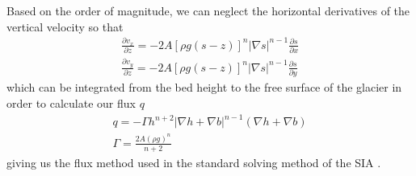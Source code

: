 \documentclass{article}
\begin{document}
Based on the order of magnitude, we can neglect the horizontal derivatives of the vertical velocity so that
\begin{subequations}
\begin{gather}
    \frac{\partial v_x}{\partial z} = -2A[\rho g (s-z)]^n|\nabla s |^{n-1}\frac{\partial s}{\partial x} \\
    \frac{\partial v_y}{\partial z} = -2A[\rho g (s-z)]^n|\nabla s |^{n-1}\frac{\partial s}{\partial y} 
\end{gather}
\end{subequations}
which can be integrated from the bed height to the free surface of the glacier in order to calculate our flux $q$
\begin{subequations}
\begin{gather}\label{q}
    q = -\Gamma  h^{n+2} |\nabla h+\nabla b|^{n-1} (\nabla h + \nabla b)  \\
    \Gamma = \frac{2A (\rho g)^n}{n+2} 
\end{gather}
\end{subequations}
giving us the flux method used in the standard solving method of the SIA \citep{Jarosch2013, Greve2009}.
\end{document}
